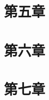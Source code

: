 \documentclass[UTF8,12pt, a4paper, oneside]{ctexart}
\begin{document}
\proi{}{}

\proi{}{}


\section{第五章}

\proi{}{}

\proi{}{}

\proi{}{}


\section{第六章}

\proi{}{}

\proi{}{}

\proi{}{}


\section{第七章}

\proi{}{}

\proi{}{}

\proi{}{}
\end{document}

